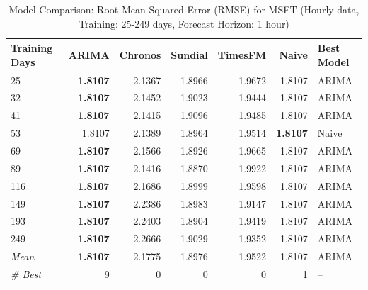\begin{table}[htbp]
\centering
\caption{Model Comparison: Root Mean Squared Error (RMSE) for MSFT (Hourly data, Training: 25-249 days, Forecast Horizon: 1 hour)}
\label{tab:comparison_MSFT_1h_train-less-year-log_h1_RMSE}
\small
\begin{tabular}{lrrrrrl}
\toprule
Training Days & ARIMA & Chronos & Sundial & TimesFM & Naive & Best Model \\
\midrule
25 & \textbf{1.8107} & 2.1367 & 1.8966 & 1.9672 & 1.8107 & ARIMA \\
32 & \textbf{1.8107} & 2.1452 & 1.9023 & 1.9444 & 1.8107 & ARIMA \\
41 & \textbf{1.8107} & 2.1415 & 1.9096 & 1.9485 & 1.8107 & ARIMA \\
53 & 1.8107 & 2.1389 & 1.8964 & 1.9514 & \textbf{1.8107} & Naive \\
69 & \textbf{1.8107} & 2.1566 & 1.8926 & 1.9665 & 1.8107 & ARIMA \\
89 & \textbf{1.8107} & 2.1416 & 1.8870 & 1.9922 & 1.8107 & ARIMA \\
116 & \textbf{1.8107} & 2.1686 & 1.8999 & 1.9598 & 1.8107 & ARIMA \\
149 & \textbf{1.8107} & 2.2386 & 1.8983 & 1.9147 & 1.8107 & ARIMA \\
193 & \textbf{1.8107} & 2.2403 & 1.8904 & 1.9419 & 1.8107 & ARIMA \\
249 & \textbf{1.8107} & 2.2666 & 1.9029 & 1.9352 & 1.8107 & ARIMA \\
\midrule
\textit{Mean} & \textbf{1.8107} & 2.1775 & 1.8976 & 1.9522 & 1.8107 & ARIMA \\
\textit{\# Best} & 9 & 0 & 0 & 0 & 1 & -- \\
\bottomrule
\end{tabular}
\end{table}